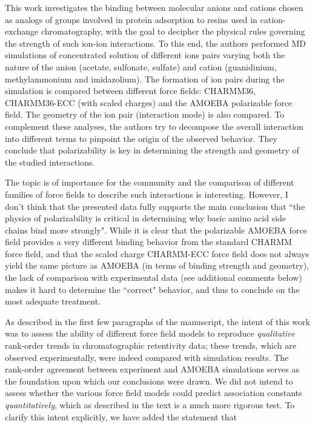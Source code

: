 \documentclass[answers,12pt]{exam}
\begin{document}
\begin{questions}

	\question This work investigates the binding between molecular anions and cations chosen as analogs of groups involved in protein adsorption to resins used in cation-exchange chromatography, with the goal to decipher the physical rules governing the strength of such ion-ion interactions. To this end, the authors performed MD simulations of concentrated solution of different ions pairs varying both the nature of the anion (acetate, sulfonate, sulfate) and cation (guanidinium, methylammonium and imidazolium). The formation of ion pairs during the simulation is compared between different force fields: CHARMM36, CHARMM36-ECC (with scaled charges) and the AMOEBA polarizable force field. The geometry of the ion pair (interaction mode) is also compared. To complement these analyses, the authors try to decompose the overall interaction into different terms to pinpoint the origin of the observed behavior. They conclude that polarizability is key in determining the strength and geometry of the studied interactions.
 
    The topic is of importance for the community and the comparison of different families of force fields to describe such interactions is interesting. However, I don’t think that the presented data fully supports the main conclusion that ``the physics of polarizability is critical in determining why basic amino acid side chains bind more strongly". While it is clear that the polarizable AMOEBA force field provides a very different binding behavior from the standard CHARMM force field, and that the scaled charge CHARMM-ECC force field does not always yield the same picture as AMOEBA (in terms of binding strength and geometry), the lack of comparison with experimental data (see additional comments below) makes it hard to determine the ``correct" behavior, and thus to conclude on the most adequate treatment. 
    \begin{solution}
    As described in the first few paragraphs of the manuscript, the intent of this work was to assess the ability of different force field models to reproduce \textit{qualitative} rank-order trends in chromatographic retentivity data; these trends, which are observed experimentally, were indeed compared with simulation results. The rank-order agreement between experiment and AMOEBA simulations serves as the foundation upon which our conclusions were drawn. We did not intend to assess whether the various force field models could predict association constants \textit{quantitatively}, which as described in the text is a much more rigorous test. To clarify this intent explicitly, we have added the statement that 


\end{solution}
\end{questions}
\end{document}
